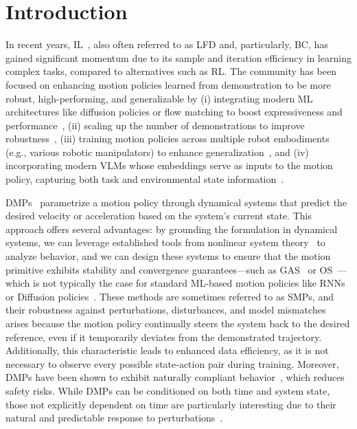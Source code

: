 \section{Introduction}

In recent years, \gls{IL}~\citep{schaal1999imitation, zare2024survey}, also often referred to as \gls{LFD} and, particularly, \gls{BC}, has gained significant momentum due to its sample and iteration efficiency in learning complex tasks, compared to alternatives such as \gls{RL}. The community has been focused on enhancing motion policies learned from demonstration to be more robust, high-performing, and generalizable by (i) integrating modern ML architectures like diffusion policies or flow matching to boost expressiveness and performance~\citep{chi2023diffusion, black2024pi0}, (ii) scaling up the number of demonstrations to improve robustness~\citep{o2024open, black2024pi0, gemini2025robotics}, (iii) training motion policies across multiple robot embodiments (e.g., various robotic manipulators) to enhance generalization~\citep{o2024open, black2024pi0}, and (iv) incorporating modern \glspl{VLM} whose embeddings serve as inputs to the motion policy, capturing both task and environmental state information~\citep{black2024pi0, kim2024openvla, gemini2025robotics}.

\glspl{DMP}~\citep{ijspeert2002learning, ijspeert2013dynamical, saveriano2023dynamic, hu2024fusion} parametrize a motion policy through dynamical systems that predict the desired velocity or acceleration based on the system’s current state. This approach offers several advantages: by grounding the formulation in dynamical systems, we can leverage established tools from nonlinear system theory~\citep{khalil2002nonlinear} to analyze behavior, and we can design these systems to ensure that the motion primitive exhibits stability and convergence guarantees—such as \gls{GAS}~\citep{ijspeert2013dynamical, rana2020euclideanizing, urain2020imitationflow, zhang2022learning, perez2023stable, perez2024puma} or \gls{OS}~\citep{ijspeert2002learning, khadivar2021learning, abu2024learning, zhi2024teaching}—which is not typically the case for standard ML-based motion policies like RNNs or Diffusion policies~\citep{chi2023diffusion, o2024open, black2024pi0, gemini2025robotics}.
These methods are sometimes referred to as \glspl{SMP}, and their robustness against perturbations, disturbances, and model mismatches arises because the motion policy continually steers the system back to the desired reference, even if it temporarily deviates from the demonstrated trajectory. Additionally, this characteristic leads to enhanced data efficiency, as it is not necessary to observe every possible state-action pair during training. Moreover, \glspl{DMP} have been shown to exhibit naturally compliant behavior~\citep{ijspeert2013dynamical, petrivc2018accelerated}, which reduces safety risks. While \glspl{DMP} can be conditioned on both time and system state, those not explicitly dependent on time are particularly interesting due to their natural and predictable response to perturbations~\citep{ijspeert2013dynamical}.

